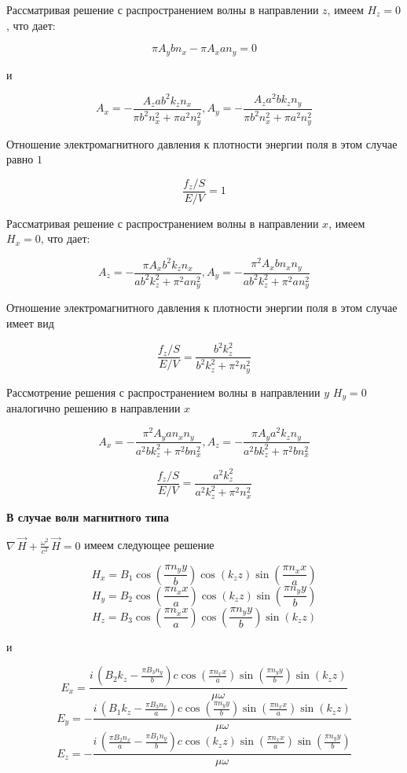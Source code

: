 \documentclass[11pt]{article}
\begin{document}
    Рассматривая решение с распространением волны в направлении \(z\), имеем
\(H_z = 0\), что дает:

    \[\pi A_{y} b n_{x} - \pi A_{x} a n_{y} = 0\]

    и

\[A_{x} = -\frac{A_{z} a b^{2} k_{z} n_{x}}{\pi b^{2} n_{x}^{2} + \pi a^{2} n_{y}^{2}},
A_{y} = -\frac{A_{z} a^{2} b k_{z} n_{y}}{\pi b^{2} n_{x}^{2} + \pi a^{2} n_{y}^{2}}\]

    Отношение электромагнитного давления к плотности энергии поля в этом
случае равно \(1\)

\[\frac{f_z/S}{E/V} = 1\]

    Рассматривая решение с распространением волны в направлении \(x\), имеем
\(H_x = 0\), что дает:

    \[A_{z} = -\frac{\pi A_{x} b^{2} k_{z} n_{x}}{a b^{2} k_{z}^{2} + \pi^{2} a n_{y}^{2}},
A_{y} = -\frac{\pi^{2} A_{x} b n_{x} n_{y}}{a b^{2} k_{z}^{2} + \pi^{2} a n_{y}^{2}}\]

    Отношение электромагнитного давления к плотности энергии поля в этом
случае имеет вид

\[\frac{f_z/S}{E/V} = \frac{b^{2} k_{z}^{2}}{b^{2} k_{z}^{2} + \pi^{2} n_{y}^{2}}\]

    Рассмотрение решения с распространением волны в направлении \(y\)
\(H_y = 0\) аналогично решению в направлении \(x\)

\[A_{x} = -\frac{\pi^{2} A_{y} a n_{x} n_{y}}{a^{2} b k_{z}^{2} + \pi^{2} b n_{x}^{2}},
A_{z} = -\frac{\pi A_{y} a^{2} k_{z} n_{y}}{a^{2} b k_{z}^{2} + \pi^{2} b n_{x}^{2}}\]

\[\frac{f_z/S}{E/V} = \frac{a^{2} k_{z}^{2}}{a^{2} k_{z}^{2} + \pi^{2} n_{x}^{2}}\]

    \textbf{В случае волн магнитного типа}

\(\nabla\,\vec{H} + \frac{\omega^2}{c^2}\,\vec{H} = 0\) имеем следующее
решение

    \[H_{x} = B_{1} \cos\left(\frac{\pi n_{y} y}{b}\right) \cos\left(k_{z} z\right) \sin\left(\frac{\pi n_{x} x}{a}\right)\]
\[H_{y} = B_{2} \cos\left(\frac{\pi n_{x} x}{a}\right) \cos\left(k_{z} z\right) \sin\left(\frac{\pi n_{y} y}{b}\right)\]
\[H_{z} = B_{3} \cos\left(\frac{\pi n_{x} x}{a}\right) \cos\left(\frac{\pi n_{y} y}{b}\right) \sin\left(k_{z} z\right)\]

    и

\[E_{x} = \frac{i \, {\left(B_{2} k_{z} - \frac{\pi B_{3} n_{y}}{b}\right)} c \cos\left(\frac{\pi n_{x} x}{a}\right) \sin\left(\frac{\pi n_{y} y}{b}\right) \sin\left(k_{z} z\right)}{\mu \omega}\]
\[E_{y} = -\frac{i \, {\left(B_{1} k_{z} - \frac{\pi B_{3} n_{x}}{a}\right)} c \cos\left(\frac{\pi n_{y} y}{b}\right) \sin\left(\frac{\pi n_{x} x}{a}\right) \sin\left(k_{z} z\right)}{\mu \omega}\]
\[E_{z} = -\frac{i \, {\left(\frac{\pi B_{2} n_{x}}{a} - \frac{\pi B_{1} n_{y}}{b}\right)} c \cos\left(k_{z} z\right) \sin\left(\frac{\pi n_{x} x}{a}\right) \sin\left(\frac{\pi n_{y} y}{b}\right)}{\mu \omega}\]
\end{document}

